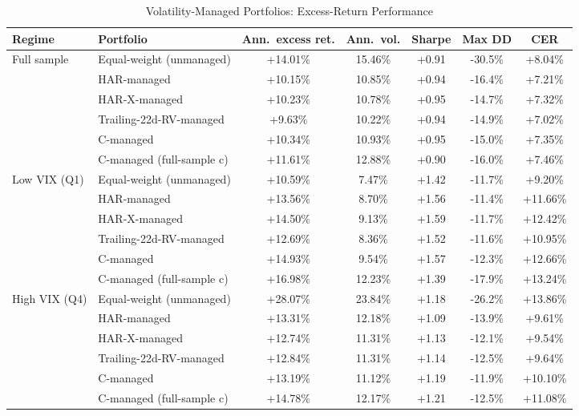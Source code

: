 
\begin{table}[htbp]
\centering
\caption{Volatility-Managed Portfolios: Excess-Return Performance}
\label{tab:volmanaged}
\small
\begin{tabular}{llccccc}
\toprule
Regime & Portfolio & Ann.\ excess ret. & Ann.\ vol. & Sharpe & Max DD & CER \\
\midrule
Full sample & Equal-weight (unmanaged) & +14.01\% & 15.46\% & +0.91 & -30.5\% & +8.04\% \\
 & HAR-managed & +10.15\% & 10.85\% & +0.94 & -16.4\% & +7.21\% \\
 & HAR-X-managed & +10.23\% & 10.78\% & +0.95 & -14.7\% & +7.32\% \\
 & Trailing-22d-RV-managed & +9.63\% & 10.22\% & +0.94 & -14.9\% & +7.02\% \\
 & C-managed & +10.34\% & 10.93\% & +0.95 & -15.0\% & +7.35\% \\
 & C-managed (full-sample c) & +11.61\% & 12.88\% & +0.90 & -16.0\% & +7.46\% \\
\midrule
Low VIX (Q1) & Equal-weight (unmanaged) & +10.59\% & 7.47\% & +1.42 & -11.7\% & +9.20\% \\
 & HAR-managed & +13.56\% & 8.70\% & +1.56 & -11.4\% & +11.66\% \\
 & HAR-X-managed & +14.50\% & 9.13\% & +1.59 & -11.7\% & +12.42\% \\
 & Trailing-22d-RV-managed & +12.69\% & 8.36\% & +1.52 & -11.6\% & +10.95\% \\
 & C-managed & +14.93\% & 9.54\% & +1.57 & -12.3\% & +12.66\% \\
 & C-managed (full-sample c) & +16.98\% & 12.23\% & +1.39 & -17.9\% & +13.24\% \\
\midrule
High VIX (Q4) & Equal-weight (unmanaged) & +28.07\% & 23.84\% & +1.18 & -26.2\% & +13.86\% \\
 & HAR-managed & +13.31\% & 12.18\% & +1.09 & -13.9\% & +9.61\% \\
 & HAR-X-managed & +12.74\% & 11.31\% & +1.13 & -12.1\% & +9.54\% \\
 & Trailing-22d-RV-managed & +12.84\% & 11.31\% & +1.14 & -12.5\% & +9.64\% \\
 & C-managed & +13.19\% & 11.12\% & +1.19 & -11.9\% & +10.10\% \\
 & C-managed (full-sample c) & +14.78\% & 12.17\% & +1.21 & -12.5\% & +11.08\% \\

\end{tabular}
\end{table}

